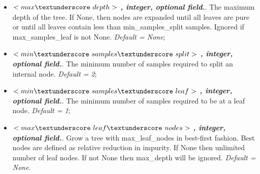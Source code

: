 \begin{itemize}
\item $<max\textunderscore~depth>$ \textbf{\textit{, integer, optional field.}}. The maximum depth of the tree. If None, then nodes are expanded until all leaves are pure or until all leaves contain less than min\_samples\_split samples. Ignored if max\_samples\_leaf is not None. \textit{Default = None};
\item $<min\textunderscore~samples\textunderscore~split>$ \textbf{\textit{, integer, optional field.}}. The minimum number of samples required to split an internal node. \textit{Default = 2};
\item $<min\textunderscore~samples\textunderscore~leaf>$ \textbf{\textit{, integer, optional field.}}. The minimum number of samples required to be at a leaf node. \textit{Default = 1};
\item $<max\textunderscore~leaf\textunderscore~nodes>$ \textbf{\textit{, integer, optional field.}}. Grow a tree with max\_leaf\_nodes in best-first fashion. Best nodes are defined as relative reduction in impurity. If None then unlimited number of leaf nodes. If not None then max\_depth will be ignored. \textit{Default = None}.
\end{itemize}
